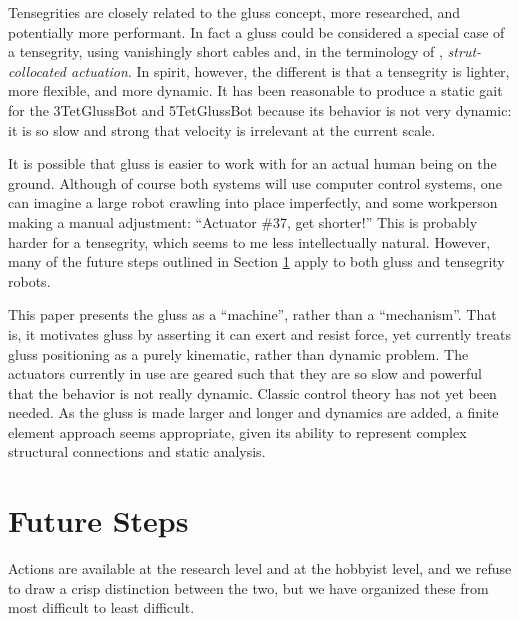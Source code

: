 \documentclass[11pt]{article}
\begin{document}
Tensegrities are closely related to the gluss concept, more researched, and potentially more performant.
In fact a gluss could be considered a special case of a tensegrity, using vanishingly short cables
and, in the terminology of \cite{paul2006}, \emph{strut-collocated actuation}.
In spirit, however, the different is that a tensegrity is lighter, more flexible, and more dynamic.
It has been reasonable to produce a static gait for the 3TetGlussBot and 5TetGlussBot because its behavior is not
very dynamic: it is so slow and strong that velocity is irrelevant at the current scale.

It is possible that gluss is easier to work with for an actual human being on the ground.
Although of course both systems will use computer control systems, one can imagine a large robot
crawling into place imperfectly, and some workperson making a manual adjustment: ``Actuator \#37, get shorter!''
This is probably harder for a tensegrity, which seems to me less intellectually natural.  However, many
of the future steps outlined in Section \ref{futuresteps} apply to both gluss and tensegrity robots.

This paper presents the gluss as a ``machine'', rather than a ``mechanism''. That is, it motivates gluss
by asserting it can exert and resist force, yet currently treats gluss positioning as a purely kinematic,
rather than dynamic problem. The actuators currently in use are geared such that they are so slow
and powerful that the behavior is not really dynamic. Classic control theory has not yet been needed.
As the gluss is made larger and longer and dynamics are added,
a finite element approach\cite{géradin2001flexible} seems appropriate,
given its ability to represent complex structural connections and static analysis.



\section{Future Steps}
\label{futuresteps}

Actions are available at the research level and at the hobbyist level, and we refuse to draw
a crisp distinction between the two, but we have organized these from most difficult to least
difficult.
\end{document}
